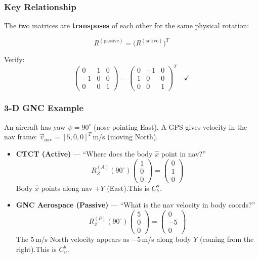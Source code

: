 \documentclass[12pt,a4paper]{article}
\begin{document}
\subsubsection*{Key Relationship}

The two matrices are \textbf{transposes} of each other for the same physical
rotation:

\begin{equation}
\boxed{
  R^{(\text{passive})} = \bigl(R^{(\text{active})}\bigr)^T
}
\end{equation}

Verify:
\[
  \begin{pmatrix} 0&1&0\\-1&0&0\\0&0&1 \end{pmatrix}
  = \begin{pmatrix} 0&-1&0\\1&0&0\\0&0&1 \end{pmatrix}^T
  \quad\checkmark
\]

\subsubsection*{3-D GNC Example}

An aircraft has yaw $\psi=90^\circ$ (nose pointing East).  A GPS gives
velocity in the nav frame: $\vec{v}_{\text{nav}} = [5,0,0]^T$\,m/s (moving
North).

\begin{itemize}
  \item \textbf{CTCT (Active)} --- ``Where does the body $\hat{x}$ point in
        nav?''
    \[
      R_Z^{(A)}(90^\circ)\begin{pmatrix}1\\0\\0\end{pmatrix}
      = \begin{pmatrix}0\\1\\0\end{pmatrix}
    \]
    Body $\hat{x}$ points along nav $+Y$ (East).\quad This is $C_b^n$.

  \item \textbf{GNC Aerospace (Passive)} --- ``What is the nav velocity in
        body coords?''
    \[
      R_Z^{(P)}(90^\circ)\begin{pmatrix}5\\0\\0\end{pmatrix}
      = \begin{pmatrix}0\\-5\\0\end{pmatrix}
    \]
    The 5\,m/s North velocity appears as $-5$\,m/s along body $Y$ (coming
    from the right).\quad This is $C_n^b$.
\end{itemize}
\end{document}
